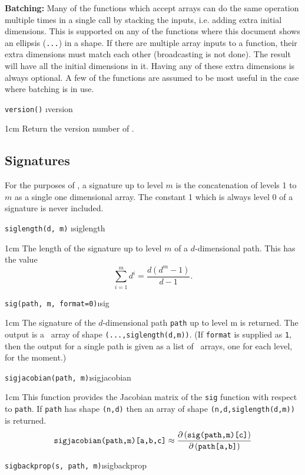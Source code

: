 \documentclass[a4paper]{extarticle}
\newenvironment{defn}{\begin{adjustwidth}{1cm}{}\ignorespaces}{\end{adjustwidth}\ignorespacesafterend}
\begin{document}
\textbf{Batching:} Many of the functions which accept arrays can do the same operation multiple times in a single call by stacking the inputs, i.e. adding extra initial dimensions. This is supported on any of the functions where this document shows an ellipsis (\verb|...|)  in a shape. If there are multiple array inputs to a function, their extra dimensions must match each other (broadcasting is not done).  The result will have all the initial dimensions in it. Having any of these extra dimensions is always optional. A few of the functions are assumed to be most useful in the case where batching is in use. %

\verb!version()! \i{version}

\begin{defn}
\nopagebreak Return the version number of \ii.
\end{defn}


\subsection{Signatures}
For the purposes of \ii, a signature up to level $m$ is the concatenation of levels 1 to $m$ as a single one dimensional array. The constant 1 which is always level 0 of a signature is never included. 

\verb!siglength(d, m)! \i{siglength}
\begin{defn}
\nopagebreak The length of the signature up to level $m$ of a $d$-dimensional path. This has the value
\[\sum_{i=1}^m d^i = \frac{d(d^m-1)}{d-1}.\]
\end{defn}

\verb!sig(path, m, format=0)!\i{sig}

\begin{defn}
\nopagebreak The signature of the $d$-dimensional path \verb|path| up to level m is returned. The output is a \numpy\ array of shape \verb!(...,siglength(d,m))!. (If \verb|format| is supplied as \verb!1!, then the output for a single path is given as a list of \numpy\ arrays, one for each level, for the moment.)
\end{defn}
\verb!sigjacobian(path, m)!\i{sigjacobian}

\begin{defn}
\nopagebreak This function provides the Jacobian matrix of the \verb|sig| function with respect to \verb|path|. If \verb|path| has shape \verb|(n,d)| then an array of shape \verb!(n,d,siglength(d,m))! is returned. 
\[\verb|sigjacobian(path,m)[a,b,c]|
 \approx
  {\partial\,(\verb|sig(path,m)[c]|) \over 
  \partial\,(\verb|path[a,b]|)}
 \]
\end{defn}
\verb!sigbackprop(s, path, m)!\i{sigbackprop}
\end{document}
